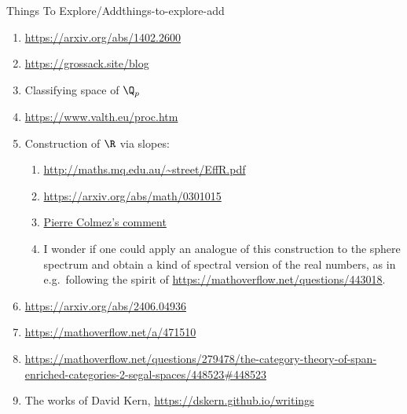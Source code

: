 \begin{remark}{Things To Explore/Add}{things-to-explore-add}
\begin{enumerate}
            \begin{align*}
                d_{V}\circ\alpha  &= g_{2}-f_{2},\\
                -\beta\circ d_{V} &= h_{1}-k_{1}.
            \end{align*}
            Can we modify this to work for usual chain complexes, seeking an answer to \url{https://mathoverflow.net/questions/424268}? What seems to make things go wrong in that case is that the chain homotopy identities are replaced with
            \begin{align*}
                \alpha_{n+1}\circ d^{V}_{n}+d^{W}_{n-1}\circ\alpha_{n} &= g_{n}-f_{n},\\
                \beta_{n+1}\circ d^{V}_{n}+d^{W}_{n-1}\circ\beta_{n}   &= k_{n}-h_{n}.
            \end{align*}
        \item \url{https://arxiv.org/abs/1402.2600}
        \item \url{https://grossack.site/blog}
        \item Classifying space of $\Q_{p}$
        \item \url{https://www.valth.eu/proc.htm}
        \item Construction of $\R$ via slopes:
            \begin{enumerate}
                \item \url{http://maths.mq.edu.au/~street/EffR.pdf}
                \item \url{https://arxiv.org/abs/math/0301015}
                \item \href{https://twitter.com/ColmezPierre/status/1809308351643165181?t=KAESWH44ufE7486diGcxrA}{Pierre Colmez's comment }
                \item I wonder if one could apply an analogue of this construction to the sphere spectrum and obtain a kind of spectral version of the real numbers, as in e.g.\ following the spirit of \href{MO 443018}{https://mathoverflow.net/questions/443018}.
            \end{enumerate}
        \item \url{https://arxiv.org/abs/2406.04936}
        \item \url{https://mathoverflow.net/a/471510}
        \item \url{https://mathoverflow.net/questions/279478/the-category-theory-of-span-enriched-categories-2-segal-spaces/448523#448523}
        \item The works of David Kern, \url{https://dskern.github.io/writings}

\end{enumerate}
\end{remark}
